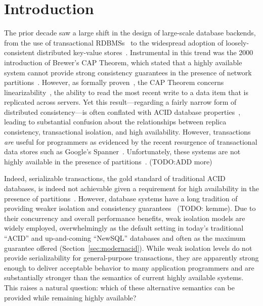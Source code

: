 
\section{Introduction}

The prior decade saw a large shift in the design of large-scale
database backends, from the use of transactional
RDBMSs~\cite{bernstein-concurrency, bernstein-book, gray-isolation,
  gray-virtues} to the widespread adoption of loosely-consistent
distributed key-value stores~\cite{bigtable, pnuts,
  dynamo}. Instrumental in this trend was the 2000 introduction of
Brewer's CAP Theorem, which stated that a highly available system
cannot provide strong consistency guarantees in the presence of
network partitions~\cite{brewer-slides}. However, as formally
proven~\cite{gilbert-cap}, the CAP Theorem concerns
linearizability~\cite{herlihy-art}, the ability to read the most
recent write to a data item that is replicated across servers. Yet
this result---regarding a fairly narrow form of distributed
consistency---is often conflated with ACID database
properties~\cite{brewer-slides, hn, foundation-article}, leading to
substantial confusion about the relationships between replica
consistency, transactional isolation, and high availability. However,
transactions \textit{are} useful for programmers as evidenced by the
recent resurgence of transactional data stores such as Google's
Spanner~\cite{spanner}. Unfortunately, these systems are not highly
available in the presence of partitions~\cite{walter, mdcc,
  foundation-article, krikellas-bargain, eiger}. (TODO:ADD more)

Indeed, serializable transactions, the gold standard of traditional
ACID databases, is indeed not achievable given a requirement for high
availability in the presence of
partitions~\cite{davidson-survey}. However, database systems have a
long tradition of providing weaker isolation and consistency
guarantees~\cite{adya, ansicritique, gray-isolation,
  gray-virtues} (TODO: kemme). Due to their concurrency and overall performance
benefits, weak isolation models are widely employed, overwhelmingly as
the default setting in today's traditional ``ACID'' and up-and-coming
``NewSQL'' databases and often as the maximum guarantee offered
(Section~\ref{sec:modernacid}). While weak isolation levels do not
provide serializability for general-purpose transactions, they are
apparently strong enough to deliver acceptable behavior to many
application programmers and are substantially stronger than the
semantics of current highly available systems. This raises a natural
question: which of these alternative semantics can be provided while
remaining highly available?

